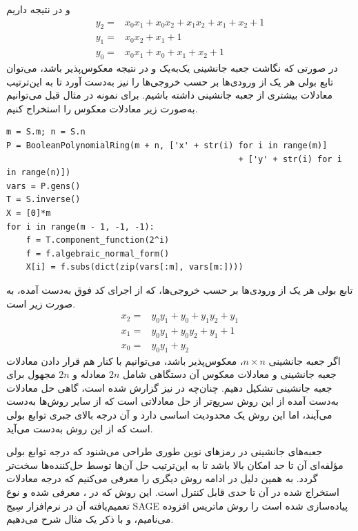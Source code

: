 	و در نتیجه داریم	
\begin{align*}
y_{2} =& x_{0} x_{1} + x_{0} x_{2} + x_{1} x_{2} + x_{1} + x_{2} + 1\\
y_{1} =& x_{0} x_{2} + x_{1} + 1\\
y_{0} =& x_{0} x_{1} + x_{0} + x_{1} + x_{2} + 1
\end{align*}
در صورتی که  نگاشت جعبه جانشینی یک‌به‌یک و در نتیجه معکوس‌پذیر باشد، می‌توان تابع بولی هر یک از ورودی‌ها بر حسب خروجی‌ها را نیز به‌دست آورد تا به این‌ترتیب   معادلات بیشتری از جعبه جانشینی داشته باشیم. برای نمونه در مثال قبل می‌توانیم به‌صورت زیر معادلات معکوس را استخراج کنیم. 

 \begin{latin}
\begin{flushleft}
\begin{lstlisting}
m = S.m; n = S.n
P = BooleanPolynomialRing(m + n, ['x' + str(i) for i in range(m)] 
                                               + ['y' + str(i) for i in range(n)])
vars = P.gens()
T = S.inverse()
X = [0]*m
for i in range(m - 1, -1, -1):
	f = T.component_function(2^i)
	f = f.algebraic_normal_form()
	X[i] = f.subs(dict(zip(vars[:m], vars[m:])))
\end{lstlisting}
\end{flushleft}
\end{latin}
 تابع بولی هر یک از ورودی‌ها بر حسب خروجی‌ها، که از اجرای کد فوق به‌دست آمده، به صورت زیر است. 
\begin{align*}
x_{2} =& y_{0} y_{1} + y_{0} + y_{1} y_{2} + y_{1}\\
x_{1} =& y_{0} y_{1} + y_{0} y_{2} + y_{1} + 1\\
x_{0} =& y_{0} y_{1} + y_{2}
\end{align*}
اگر جعبه جانشینی 
$n\times n$، 
معکوس‌پذیر باشد، می‌توانیم با کنار هم قرار دادن معادلات جعبه جانشینی  و معادلات معکوس آن دستگاهی شامل 
$2n$
معادله
و 
$2n$
مجهول برای جعبه جانشینی تشکیل دهیم.   چنان‌چه در 
\cite{cryptoeprint:2017:007}
نیز گزارش شده است، گاهی حل معادلات به‌دست آمده از این روش  سریع‌تر از حل معادلاتی است که  از سایر روش‌ها به‌دست می‌آیند، اما این روش یک محدودیت اساسی دارد و آن درجه بالای جبری توابع بولی است که از این روش به‌دست می‌آید. 

جعبه‌های جانشینی در رمزهای نوین طوری طراحی می‌شنود که درجه توابع بولی  مؤلفه‌ای  آن تا حد امکان بالا باشد تا به این‌ترتیب حل آن‌ها توسط حل‌کننده‌ها سخت‌تر گردد.  به همین دلیل در ادامه روش دیگری را معرفی می‌کنیم که درجه معادلات استخراج شده در آن تا حدی قابل کنترل است. 	 این روش  که در 
\cite{DBLP:conf/fse/BiryukovC03}، 
	معرفی شده و نوع تعمیم‌یافته آن در نرم‌افزار سِیج 
	\gls{SAGE}
	\cite{sagemath}
	 پیاده‌سازی شده است را  روش ماتریس افزوده می‌نامیم، و  با ذکر یک مثال شرح می‌دهیم. 
	 
